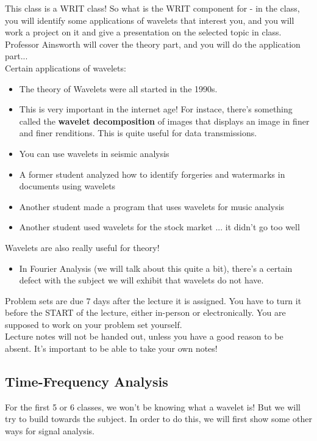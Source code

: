 \documentclass{article}
\begin{document}
This class is a WRIT class! So what is the WRIT component for - in the class, you will identify some applications of wavelets that interest you, and you will work a project on it and give a presentation on the selected topic in class. Professor Ainsworth will cover the theory part, and you will do the application part...\\

Certain applications of wavelets:
\begin{itemize}
    \item The theory of Wavelets were all started in the 1990s.
    \item This is very important in the internet age! For instace, there's something called the \textbf{wavelet decomposition} of images that displays an image in finer and finer renditions. This is quite useful for data transmissions.
    \item You can use wavelets in seismic analysis
    \item A former student analyzed how to identify forgeries and watermarks in documents using wavelets
    \item Another student made a program that uses wavelets for music analysis
    \item Another student used wavelets for the stock market ... it didn't go too well
\end{itemize}

Wavelets are also really useful for theory!
\begin{itemize}
    \item In Fourier Analysis (we will talk about this quite a bit), there's a certain defect with the subject we will exhibit that wavelets do not have.
\end{itemize}

Problem sets are due $7$ days after the lecture it is assigned. You have to turn it before the START of the lecture, either in-person or electronically. You are supposed to work on your problem set yourself.\\

Lecture notes will not be handed out, unless you have a good reason to be absent. It's important to be able to take your own notes!

\subsection{Time-Frequency Analysis}

For the first 5 or 6 classes, we won't be knowing what a wavelet is! But we will try to build towards the subject. In order to do this, we will first show some other ways for signal analysis.\\
\end{document}
